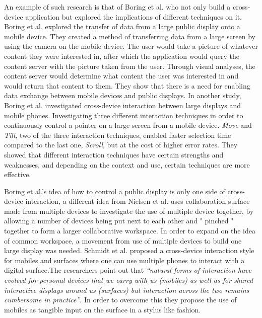 An example of such research is that of Boring et al. \cite{Boring:2007} who not only build a cross-device application but explored the implications of different techniques on it. Boring et al. explored the transfer of data from a large public display onto a mobile device.
They created a method of transferring data from a large screen by using the camera on the mobile device.
The user would take a picture of whatever content they were interested in, after which the application would query the content server with the picture taken from the user.
Through visual analyses, the content server would determine what content the user was interested in and would return that content to them.
They show that there is a need for enabling data exchange between mobile devices and public displays.
In another study, Boring et al. \cite{Boring:2009} investigated cross-device interaction between large displays and mobile phones.
Investigating three different interaction techniques in order to continuously control a pointer on a large screen from a mobile device.
\emph{Move} and \emph{Tilt}, two of the three interaction techniques, enabled faster selection time compared to the last one, \emph{Scroll}, but at the cost of higher error rates.
They showed that different interaction techniques have certain strengths and weaknesses, and depending on the context and use, certain techniques are more effective.

Boring et al.'s idea \cite{Boring:2009} of how to control a public display is only one side of cross-device interaction, a different idea from Nielsen et al. \cite{Nielsen:2014} uses collaboration surface made from multiple devices to investigate the  use of multiple device together, by allowing a number of devices being put next to each other and " pinched " together to form a larger collaborative workspace. In order to expand on the idea of common workspace, a movement from use of multiple devices to build one large display was needed. Schmidt et al. \cite{Schmidt:2012} proposed a cross-device interaction style for mobiles and surfaces where one can use multiple phones to interact with a digital surface.The researchers point out that \emph{``natural forms of interaction have evolved for personal devices that we carry with us (mobiles) as well as for shared interactive displays around us (surfaces) but interaction across the two remains cumbersome in practice''}. In order to overcome this they propose the use of mobiles as tangible input on the surface in a stylus like fashion.

